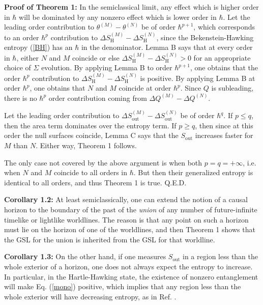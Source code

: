 \documentclass[12pt]{article}
\begin{document}
\textbf{Proof of Theorem 1:} In the semiclassical limit, any effect which is higher order in $\hbar$ will be dominated by any nonzero effect which is lower order in $\hbar$.  Let the leading order contribution to $\theta^{(M)} - \theta^{(N)}$ be of order $\hbar^{p + 1}$, which 
corresponds to an order $\hbar^p$ contribution to $\Delta S_\mathrm{H}^{(M)} - \Delta S_\mathrm{H}^{(N)}$, since the Bekenstein-Hawking entropy (\ref{BH}) has an $\hbar$ in the denominator.  Lemma B says that at every order in $\hbar$, either $N$ and $M$ coincide or else $\Delta S_\mathrm{H}^{(M)} - \Delta S_\mathrm{H}^{(N)} > 0$ for an appropriate choice of $\Sigma$ evolution.  By applying Lemma B to order $\hbar^{p + 1}$, one obtains that the order $\hbar^p$ contribution to $\Delta S_\mathrm{H}^{(M)} - \Delta S_\mathrm{H}^{(N)}$ is positive.  By applying Lemma B at order $\hbar^p$, one obtains that $N$ and $M$ coincide at order $\hbar^p$.  Since $Q$ is subleading, there is no $\hbar^p$ order contribution coming from $\Delta Q^{(M)} - \Delta Q^{(N)}$.

Let the leading order contribution to $\Delta S_\mathrm{out}^{(M)} - \Delta S_\mathrm{out}^{(N)}$ be of order $\hbar^q$.  If $p \le q$, then the area term dominates over the entropy term.  If $p \ge q$, then since at this order the null surfaces coincide, Lemma C says that the $S_\mathrm{out}$ increases faster for $M$ than $N$.  Either way, Theorem 1 follows.

The only case not covered by the above argument is when both $p = q = +\infty$, i.e. when $N$ and $M$ coincide to all orders in $\hbar$.  But then their generalized entropy is identical to all orders, and thus Theorem 1 is true.  Q.E.D.

\textbf{Corollary 1.2:} At least semiclassically, one can extend the notion of a causal horizon to the boundary of the past of the \emph{union} of any number of future-infinite timelike or lightlike worldlines.  The reason is that any point on such a horizon must lie on the horizon of one of the worldlines, and then Theorem 1 shows that the GSL for the union is inherited from the GSL for that worldline.

\textbf{Corollary 1.3:} On the other hand, if one measures $S_\mathrm{out}$ in a region less than the whole exterior of a horizon, one does not always expect the entropy to increase.  In particular, in the Hartle-Hawking state, the existence of nonzero entanglement will make Eq. (\ref{mono}) positive, which implies that any region less than the whole exterior will have decreasing entropy, as in Ref. \cite{deriv}.
\end{document}
